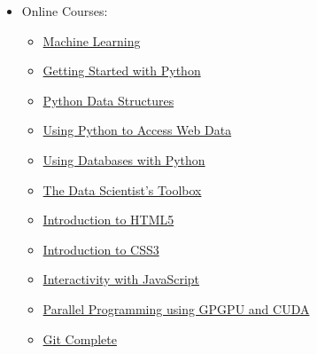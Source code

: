 \begin{itemize}
	
	\item[]  Online Courses: 
	
	\begin{multicols}{2}
	\begin{itemize}
		\item {}  \href{https://www.coursera.org/learn/machine-learning}{Machine Learning}
		
		\item {} \href{https://www.coursera.org/learn/python}{Getting Started with Python} 
		
		\item  {} \href{https://www.coursera.org/learn/python-data}{Python Data Structures}  
		
		\item {}  \href{https://www.coursera.org/learn/python-network-data}{Using Python to Access Web Data} 
		
		\item  {} \href{https://www.coursera.org/learn/python-databases}{Using Databases with Python}  
		
		\item  {}  \href{https://www.coursera.org/learn/data-scientists-tools}{The Data Scientist's Toolbox}
			 
		\item  {} \href{https://www.coursera.org/learn/html}{Introduction to HTML5} 
		
		\item  {} \href{https://www.coursera.org/learn/introcss}{Introduction to CSS3} 
		
		\item  {} \href{https://www.coursera.org/learn/javascript}{Interactivity with JavaScript}  
		
		\item  {\large{}} \href{https://www.udemy.com/introduction-to-parallel-programming-using-gpgpu-and-cuda/learn/v4/overview}{Parallel Programming using GPGPU and CUDA}
		
		\item  {\large{}} \href{https://www.udemy.com/git-complete/learn/v4/overview}{Git Complete}
		
	\end{itemize}
	\end{multicols}


\end{itemize}

